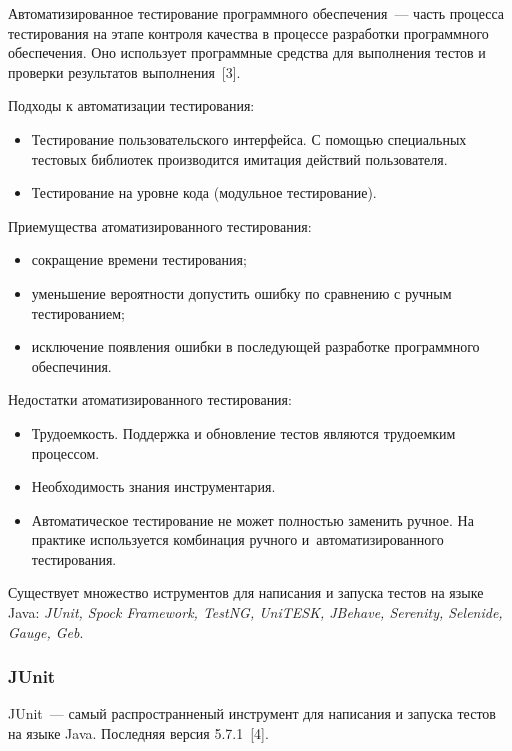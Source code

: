  Автоматизированное тестирование программного обеспечения~--- часть процесса тестирования на этапе контроля качества в процессе разработки программного обеспечения. Оно использует программные средства для выполнения тестов и проверки результатов выполнения~[3].
 
 Подходы к автоматизации тестирования:
 
 \begin{itemize}
 	\item Тестирование пользовательского интерфейса. С помощью специальных тестовых библиотек производится имитация действий пользователя.
 	\item Тестирование на уровне кода (модульное тестирование).
 \end{itemize} 

 Приемущества атоматизированного тестирования:

\begin{itemize}
	\item сокращение времени тестирования; 
	\item уменьшение вероятности допустить ошибку по сравнению с ручным тестированием;
	\item исключение появления ошибки в последующей разработке программного обеспечиния.
\end{itemize} 

 Недостатки атоматизированного тестирования:

\begin{itemize}
	\item Трудоемкость. Поддержка и обновление тестов являются трудоемким процессом.
	\item Необходимость знания инструментария.
	\item Автоматическое тестирование не может полностью заменить ручное. На практике используется комбинация ручного и~автоматизированного тестирования.
\end{itemize} 

Существует множество иструментов для написания и запуска тестов на языке Java: \textit{JUnit, Spock Framework, TestNG, UniTESK, JBehave, Serenity, Selenide, Gauge, Geb}.


\subsubsection{JUnit}

JUnit~--- самый распространненый инструмент для написания и запуска тестов на языке Java. Последняя версия 5.7.1~[4].

